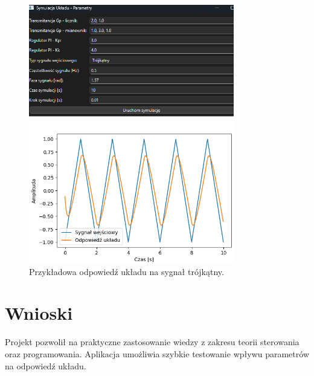 \documentclass[12pt,a4paper]{article}
\begin{document}
\begin{figure}[h!]
    \centering
    \includegraphics[width=0.8\textwidth]{wykres5.png}
    \caption{Przykładowa odpowiedź układu na sygnał trójkątny.}
\end{figure}

\section{Wnioski}
Projekt pozwolił na praktyczne zastosowanie wiedzy z zakresu teorii sterowania oraz programowania. Aplikacja umożliwia szybkie testowanie wpływu parametrów na odpowiedź układu.
\end{document}
